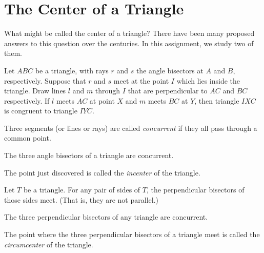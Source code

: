 \chapter{The Center of a Triangle}

What might be called the center of a triangle? There have been many proposed answers to this question over the centuries. In this assignment, we study two of them.

\begin{conjecture}\label{conj:angle-bisectors-concurrent}
Let $ABC$ be a triangle, with rays $r$ and $s$ the angle bisectors at $A$ and $B$, respectively. Suppose that $r$ and $s$ meet at the point $I$ which lies inside the triangle. Draw lines $l$ and $m$ through $I$ that are perpendicular to $AC$ and $BC$ respectively. If $l$ meets $AC$ at point $X$ and $m$ meets $BC$ at $Y$, then triangle $IXC$ is congruent to triangle $IYC$.
\end{conjecture}


\begin{definition}\label{defn:concurrent}
Three segments (or lines or rays) are called \emph{concurrent} if they all pass through a common point.
\end{definition}

\begin{conjecture}\label{conj:incenter-concurrent}
The three angle bisectors of a triangle are concurrent.
\end{conjecture}

\begin{definition}\label{defn:incenter}
The point just discovered is called the \emph{incenter} of the triangle.
\end{definition}

\begin{conjecture}\label{conj:meeting-perp-bisectors}
Let $T$ be a triangle. For any pair of sides of $T$, the perpendicular bisectors of those sides meet. (That is, they are not parallel.)
\end{conjecture}

\begin{conjecture}\label{conj:circumcenter}
The three perpendicular bisectors of any triangle are concurrent.
\end{conjecture}

\begin{definition}\label{defn:circumcenter}
The point where the three perpendicular bisectors of a triangle meet is called the \emph{circumcenter} of the triangle.
\end{definition}




